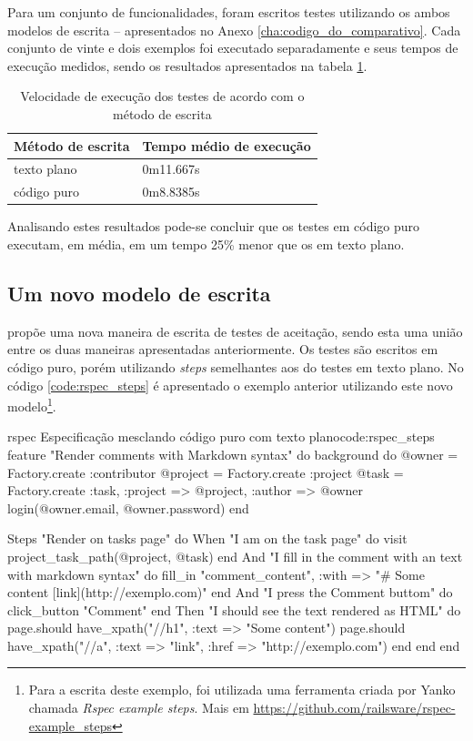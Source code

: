 Para um conjunto de funcionalidades, foram escritos testes utilizando os ambos modelos de escrita – apresentados no Anexo \ref{cha:codigo_do_comparativo}. Cada conjunto de vinte e dois exemplos foi executado separadamente e seus tempos de execução medidos, sendo os resultados apresentados na tabela \ref{table:tempo_de_execucao}.

\begin{table}[ht]
\caption{Velocidade de execução dos testes de acordo com o método de escrita}
\label{table:tempo_de_execucao}
\centering
\begin{tabular}{p{4.5cm} p{6.5cm}}
\toprule
\textbf{Método de escrita} & \textbf{Tempo médio de execução} \\
\midrule[1pt]
texto plano & 0m11.667s \\ \midrule
código puro & 0m8.8385s \\
\bottomrule
\end{tabular}
\end{table}

Analisando estes resultados pode-se concluir que os testes em código puro executam, em média, em um tempo 25\% menor que os em texto plano.


\subsection{Um novo modelo de escrita} %
\label{sub:um_novo_modelo_de_escrita}

 propõe uma nova maneira de escrita de testes de aceitação, sendo esta uma união entre os duas maneiras apresentadas anteriormente. Os testes são escritos em código puro, porém utilizando \textit{steps} semelhantes aos do testes em texto plano. No código \ref{code:rspec_steps} é apresentado o exemplo anterior utilizando este novo modelo\footnote{Para a escrita deste exemplo, foi utilizada uma ferramenta criada por Yanko chamada \textit{Rspec example steps}. Mais em \url{https://github.com/railsware/rspec-example_steps}}.

\begin{mycode}{rspec}%
{Especificação mesclando código puro com texto plano}{code:rspec_steps}
feature "Render comments with Markdown syntax" do
  background do
    @owner = Factory.create :contributor
    @project = Factory.create :project
    @task = Factory.create :task, :project => @project, :author => @owner
    login(@owner.email, @owner.password)
  end

  Steps "Render on tasks page" do
    When "I am on the task page" do
      visit project_task_path(@project, @task)
    end
    And "I fill in the comment with an text with markdown syntax" do
      fill_in "comment_content", :with => "# Some content [link](http://exemplo.com)"
    end
    And "I press the Comment buttom" do
      click_button "Comment"
    end
    Then "I should see the text rendered as HTML" do
      page.should have_xpath("//h1", :text => "Some content")
      page.should have_xpath("//a", :text => "link", :href => "http://exemplo.com")
    end
  end
end
\end{mycode}


